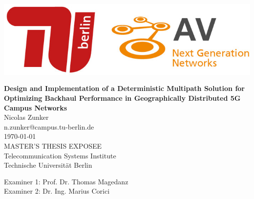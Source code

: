 
\thispagestyle{empty}

\begin{center}
\includegraphics[width=.67\linewidth, height=.2\linewidth]{fig/Logo_Header}
\end{center}
\begin{center}
    \LARGE{ \bfseries Design and Implementation of a Deterministic Multipath Solution for Optimizing Backhaul Performance in Geographically Distributed 5G Campus Networks}\\[2pc]

    \large{Nicolas Zunker}\\
    \large{n.zunker@campus.tu-berlin.de}\\[1pc]
    \large{\today}\\[2pc]

    MASTER'S THESIS EXPOSEE\\
    Telecommunication Systems Institute\\
    Technische Universität Berlin
\end{center}
\vfill

Examiner 1: Prof. Dr. Thomas Magedanz
\hfill{}\\
Examiner 2: Dr. Ing. Marius Corici

\afterpage{\null\thispagestyle{empty}\newpage}
